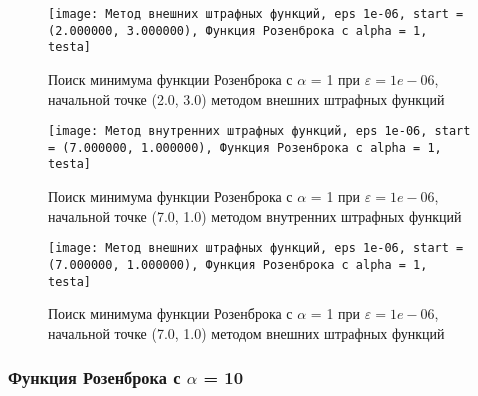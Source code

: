             \begin{figure}[H]
	        \centering
	        \texttt{[image: Метод внешних штрафных функций, eps 1e-06, start = (2.000000, 3.000000), Функция Розенброка с alpha = 1, testa]}%
	        \caption{Поиск минимума функции Розенброка с $\alpha$ = 1 при $\varepsilon = 1e-06$, начальной точке (2.0, 3.0) методом внешних штрафных функций}
	        \vspace*{-1.2cm}
            \end{figure}
            
            \begin{figure}[H]
	        \centering
	        \texttt{[image: Метод внутренних штрафных функций, eps 1e-06, start = (7.000000, 1.000000), Функция Розенброка с alpha = 1, testa]}%
	        \caption{Поиск минимума функции Розенброка с $\alpha$ = 1 при $\varepsilon = 1e-06$, начальной точке (7.0, 1.0) методом внутренних штрафных функций}
	        \vspace*{-1.2cm}
            \end{figure}
            
            \begin{figure}[H]
	        \centering
	        \texttt{[image: Метод внешних штрафных функций, eps 1e-06, start = (7.000000, 1.000000), Функция Розенброка с alpha = 1, testa]}%
	        \caption{Поиск минимума функции Розенброка с $\alpha$ = 1 при $\varepsilon = 1e-06$, начальной точке (7.0, 1.0) методом внешних штрафных функций}
	        \vspace*{-1.2cm}
            \end{figure}
            \subsubsection{Функция Розенброка с $\alpha$ = 10}

